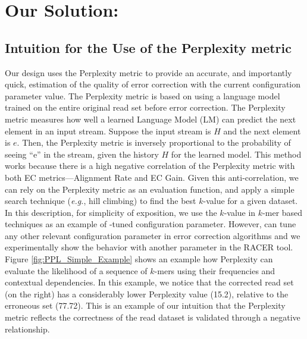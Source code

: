 \section{Our Solution: {\bf \name}}
\subsection{Intuition for the Use of the Perplexity metric}
Our design uses the Perplexity metric to provide an accurate, and importantly quick, estimation of the quality of error correction with the current configuration parameter value. %
The Perplexity metric is based on using a language model trained on the entire original read set before error correction.
The Perplexity metric measures how well a learned Language Model (LM) can predict the next element in an input stream. Suppose the input stream is $H$ and the next element is $e$. Then, the Perplexity metric is inversely proportional to the probability of seeing ``e'' in the stream, given the history $H$ for the learned model.
This method works because there is a high negative correlation of the Perplexity metric with both EC metrics---Alignment Rate and EC Gain.
Given this anti-correlation, we can rely on the Perplexity metric as an evaluation function, and apply a simple search technique (\textit{e.g.}, hill climbing) to find the best $k$-value for a given dataset. In this description, for simplicity of exposition, we use the $k$-value in $k$-mer based techniques as an example of \name-tuned configuration parameter. However, \name can tune any other relevant configuration parameter in error correction algorithms and we experimentally show the behavior with another parameter in the RACER tool. 
Figure \ref{fig:PPL_Simple_Example} shows an example how Perplexity can evaluate the likelihood of a sequence of $k$-mers using their frequencies and contextual dependencies. In this example, we notice that the corrected read set (\ie on the right) has a considerably lower Perplexity value (15.2), relative to the erroneous set (77.72). This is an example of our intuition that the Perplexity metric reflects the correctness of the read dataset is validated through a negative relationship.

